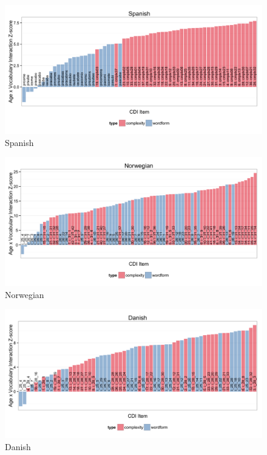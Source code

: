 \documentclass[10pt,letterpaper]{article}
\begin{document}
\begin{figure}[h]
\begin{center}
\includegraphics[width=\linewidth]{plots/spanish_interactions}
\end{center}
\caption{Spanish} 
\label{spanish_interactions}
\end{figure}

\begin{figure}[h]
\begin{center}
\includegraphics[width=\linewidth]{plots/norwegian_interactions}
\end{center}
\caption{Norwegian} 
\label{norwegian_interactions}
\end{figure}

\begin{figure}[h]
\begin{center}
\includegraphics[width=\linewidth]{plots/danish_interactions}
\end{center}
\caption{Danish} 
\label{danish_interactions}
\end{figure}
\end{document}
